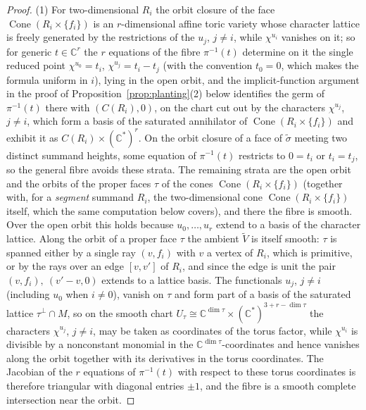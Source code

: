 \documentclass[11pt]{amsart}
\theoremstyle{definition}
\theoremstyle{remark}
\newcommand{\CC}{\mathbb{C}}
\begin{document}
\begin{proof}
(1)  For two-dimensional $R_i$ the
orbit closure of the face $\operatorname{Cone}(R_i\times\{f_i\})$ is an
$r$-dimensional affine toric variety whose character lattice is freely
generated by the restrictions of the $u_j$, $j \neq i$, while
$\chi^{u_i}$ vanishes on it; so for generic $t\in\CC^r$ the $r$ equations of
the fibre $\pi^{-1}(t)$ determine on it the single reduced point
$\chi^{u_0}=t_i$, $\chi^{u_j}=t_i-t_j$ (with the convention $t_0 = 0$,
which makes the formula uniform in $i$), lying in the open orbit, and the
implicit-function argument in the proof of
Proposition~\ref{prop:planting}(2) below identifies the germ of
$\pi^{-1}(t)$ there with $(C(R_i),0)$, on the chart cut out by the
characters $\chi^{u_j}$, $j \neq i$, which form a basis of the
saturated annihilator of $\operatorname{Cone}(R_i\times\{f_i\})$ and
exhibit it as $C(R_i)\times(\CC^\ast)^r$.  On the orbit closure of a face of
$\widetilde\sigma$ meeting two distinct summand heights, some equation of
$\pi^{-1}(t)$ restricts to $0=t_i$ or $t_i=t_j$, so the general fibre avoids
these strata.  The remaining strata are the open orbit and the orbits of
the proper faces $\tau$ of the cones
$\operatorname{Cone}(R_i\times\{f_i\})$ (together with, for a
\emph{segment} summand $R_i$, the two-dimensional cone
$\operatorname{Cone}(R_i\times\{f_i\})$ itself, which the same
computation below covers), and there the fibre is smooth.
Over the open orbit this holds because $u_0,\dots,u_r$ extend to a basis of
the character lattice.  Along the orbit of a proper face $\tau$ the ambient
$\widetilde V$ is itself smooth: $\tau$ is spanned either by a single ray
$(v,f_i)$ with $v$ a vertex of $R_i$, which is primitive, or by the rays
over an edge $[v,v']$ of $R_i$, and since the edge is unit the pair
$(v,f_i),\ (v'-v,0)$ extends to a lattice basis.  The functionals $u_j$,
$j \neq i$ (including $u_0$ when $i \neq 0$), vanish on $\tau$ and form part of a basis of
the saturated lattice $\tau^\perp \cap M$, so on the smooth chart
$U_\tau \cong \CC^{\dim\tau}\times(\CC^\ast)^{3+r-\dim\tau}$ the characters
$\chi^{u_j}$, $j\neq i$, may be taken as coordinates of
the torus factor, while $\chi^{u_i}$ is divisible by a nonconstant monomial
in the $\CC^{\dim\tau}$-coordinates and hence vanishes along the orbit
together with its derivatives in the torus coordinates.  The Jacobian of
the $r$ equations of $\pi^{-1}(t)$ with respect to
these torus coordinates is therefore triangular with diagonal entries
$\pm 1$, and the fibre is a
smooth complete intersection near the orbit.


\end{proof}
\end{document}
